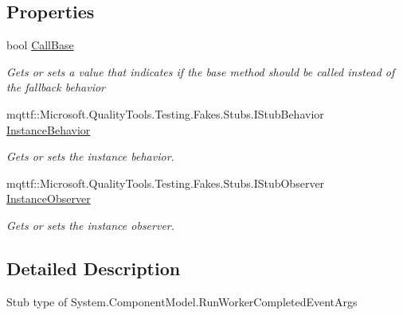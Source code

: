 \subsection*{Properties}
\begin{DoxyCompactItemize}
\item 
bool \hyperlink{class_system_1_1_component_model_1_1_fakes_1_1_stub_run_worker_completed_event_args_abf2c1ff328bb2e7efd242ee2110bfe07}{Call\-Base}
\begin{DoxyCompactList}\small\item\em Gets or sets a value that indicates if the base method should be called instead of the fallback behavior\end{DoxyCompactList}\item 
mqttf\-::\-Microsoft.\-Quality\-Tools.\-Testing.\-Fakes.\-Stubs.\-I\-Stub\-Behavior \hyperlink{class_system_1_1_component_model_1_1_fakes_1_1_stub_run_worker_completed_event_args_ab02a455079bf132e6916184dbf3db119}{Instance\-Behavior}
\begin{DoxyCompactList}\small\item\em Gets or sets the instance behavior.\end{DoxyCompactList}\item 
mqttf\-::\-Microsoft.\-Quality\-Tools.\-Testing.\-Fakes.\-Stubs.\-I\-Stub\-Observer \hyperlink{class_system_1_1_component_model_1_1_fakes_1_1_stub_run_worker_completed_event_args_aeb12ebb9d15ef70d9f90957df1c2278b}{Instance\-Observer}
\begin{DoxyCompactList}\small\item\em Gets or sets the instance observer.\end{DoxyCompactList}\end{DoxyCompactItemize}


\subsection{Detailed Description}
Stub type of System.\-Component\-Model.\-Run\-Worker\-Completed\-Event\-Args



